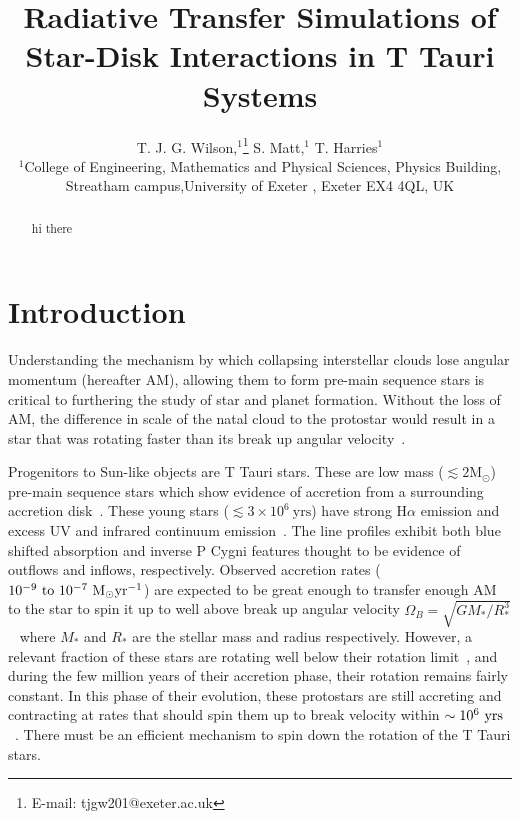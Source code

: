 \documentclass[fleqn,usenatbib]{mnras}
\title[Radiative Transfer of Star-Disk Interactions]{Radiative Transfer Simulations of Star-Disk Interactions in T Tauri Systems}
\author[T. J. G. Wilson et al.]{
T. J. G. Wilson,$^{1}$\thanks{E-mail: tjgw201@exeter.ac.uk}
S. Matt,$^{1}$
T. Harries$^{1}$
\\
$^{1}$College of Engineering, Mathematics and Physical Sciences, Physics Building, Streatham campus,University of Exeter , Exeter EX4 4QL, UK\\
}
\begin{document}
\label{firstpage}
\pagerange{\pageref{firstpage}--\pageref{lastpage}}
\maketitle
\begin{abstract}
\noindent hi there
\end{abstract}



\section{Introduction}
\label{sec:introduction}
Understanding the mechanism by which collapsing interstellar clouds lose angular momentum (hereafter AM), allowing them to form pre-main sequence stars is critical to furthering the study of star and planet formation. Without the loss of AM, the difference in scale of the natal cloud to the protostar would result in a star that was rotating faster than its break up angular velocity~\citep{Hartmann:2016gu}. 


Progenitors to Sun-like objects are T Tauri stars. These are low mass ($\lesssim 2 \textrm{M}_\odot$) pre-main sequence stars which show evidence of accretion from a surrounding accretion disk~\citep{1998ApJ...495..385H}. These young stars ($\lesssim3\times10^{6}~\textrm{yrs}$) have strong H$\alpha$ emission and excess UV and infrared continuum emission~\citep{2005MNRAS.358..671K}. The line profiles exhibit both blue shifted absorption and inverse P Cygni features thought to be evidence of outflows and inflows, respectively. Observed accretion rates ($10^{-9}~\textrm{to}~10^{-7}~{\rm M_{\odot} yr^{-1}}$) are expected to be great enough to transfer enough AM to the star to spin it up to well above break up angular velocity $\Omega_B = \sqrt{GM_{*}/R_{*}^3}$~\citep{2005ApJ...632L.135M} where $M_{\ast}$ and $R_{\ast}$ are the stellar mass and radius respectively. However, a relevant fraction of these stars are rotating well below their rotation limit~\citep{1993A&A...272..176B}, and during the few million years of their accretion phase, their rotation remains fairly constant. In this phase of their evolution, these protostars are still accreting and contracting at rates that should spin them up to break velocity within $\sim10^{6}~{\rm yrs}$~\citep{2009A&A...508.1117Z}. There must be an efficient mechanism to spin down the rotation of the T Tauri stars. 
\end{document}
